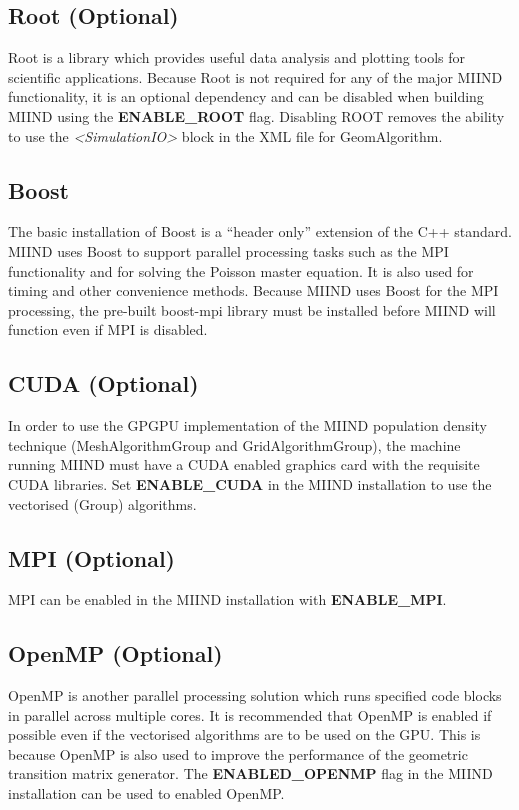\documentclass[utf8]{frontiers_suppmat} %
\begin{document}
\subsection*{Root (Optional)}
Root \citep{brun1997root} is a library which provides useful data analysis and plotting tools for scientific applications. Because Root is not required for any of the major MIIND functionality, it is an optional dependency and can be disabled when building MIIND using the \textbf{ENABLE\_ROOT} flag. Disabling ROOT removes the ability to use the \textit{\textless SimulationIO\textgreater} block in the XML file for GeomAlgorithm. \\

\subsection*{Boost}
The basic installation of Boost is a ``header only'' extension of the C++ standard. MIIND uses Boost to support parallel processing tasks such as the MPI functionality and for solving the Poisson master equation. It is also used for timing and other convenience methods. Because MIIND uses Boost for the MPI processing, the pre-built boost-mpi library must be installed before MIIND will function even if MPI is disabled. \\

\subsection*{CUDA (Optional)}
In order to use the GPGPU implementation of the MIIND population density technique (MeshAlgorithmGroup and GridAlgorithmGroup), the machine running MIIND must have a CUDA enabled graphics card with the requisite CUDA libraries. Set \textbf{ENABLE\_CUDA} in the MIIND installation to use the vectorised (Group) algorithms.\\

\subsection*{MPI (Optional)}
MPI can be enabled in the MIIND installation with \textbf{ENABLE\_MPI}. \\

\subsection*{OpenMP (Optional)}
OpenMP is another parallel processing solution which runs specified code blocks in parallel across multiple cores. It is recommended that OpenMP is enabled if possible even if the vectorised algorithms are to be used on the GPU. This is because OpenMP is also used to improve the performance of the geometric transition matrix generator. The \textbf{ENABLED\_OPENMP} flag in the MIIND installation can be used to enabled OpenMP.\\
\end{document}
